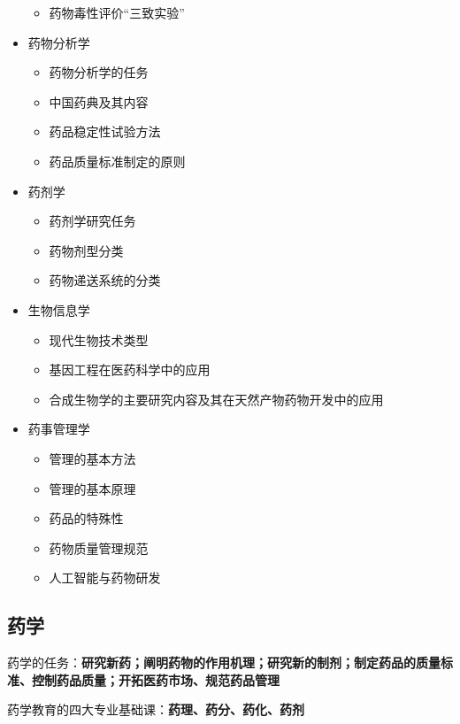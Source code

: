 \begin{itemize}
\begin{itemize}
        \item 药物毒性评价“三致实验”
    \end{itemize}
    \item 药物分析学
    \begin{itemize}
        \item 药物分析学的任务
        \item 中国药典及其内容
        \item 药品稳定性试验方法
        \item 药品质量标准制定的原则
    \end{itemize}
    \item 药剂学
    \begin{itemize}
        \item 药剂学研究任务
        \item 药物剂型分类
        \item 药物递送系统的分类
    \end{itemize}
    \item 生物信息学
    \begin{itemize}
        \item 现代生物技术类型
        \item 基因工程在医药科学中的应用
        \item 合成生物学的主要研究内容及其在天然产物药物开发中的应用
    \end{itemize}
    \item 药事管理学
    \begin{itemize}
        \item 管理的基本方法
        \item 管理的基本原理
        \item 药品的特殊性
        \item 药物质量管理规范
        \item 人工智能与药物研发
    \end{itemize}
\end{itemize}
\subsection{药学}%
\label{sub:复习：药学}
\begin{notation}
    药学的任务：\textbf{研究新药；阐明药物的作用机理；研究新的制剂；制定药品的质量标准、控制药品质量；开拓医药市场、规范药品管理}
\end{notation}
\begin{notation}
    药学教育的四大专业基础课：\textbf{药理、药分、药化、药剂}
\end{notation}
